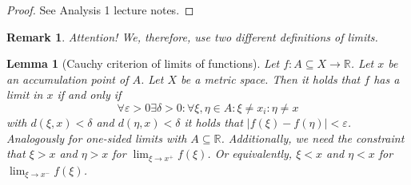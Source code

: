\documentclass{article}
\newtheorem{lemma}{Lemma}  \numberwithin{lemma}{section}
\newtheorem{remark}{Remark}  \numberwithin{remark}{section}
\newcommand{\card}[1]{\left|#1\right|}
\begin{document}
\begin{proof}
  See Analysis 1 lecture notes.
\end{proof}

\begin{remark}
  Attention! We, therefore, use two different definitions of limits.
\end{remark}

\begin{lemma}[Cauchy criterion of limits of functions] %
  \label{cauchy-crit}
  Let $f: A \subseteq X \to \mathbb R$. Let $x$ be an accumulation point of $A$.
  Let $X$ be a metric space. Then it holds that
  $f$ has a limit in $x$ if and only if
  \[ \forall \varepsilon > 0 \exists \delta > 0: \forall \xi, \eta \in A: \xi \neq x_i: \eta \neq x \]
  with $d(\xi, x) < \delta$ and $d(\eta, x) < \delta$ it holds that $\card{f(\xi) - f(\eta)} < \varepsilon$.
  Analogously for one-sided limits with $A \subseteq \mathbb R$.
  Additionally, we need the constraint that $\xi > x$ and $\eta > x$ for $\lim_{\xi \to x^+} f(\xi)$.
  Or equivalently, $\xi < x$ and $\eta < x$ for $\lim_{\xi \to x^-} f(\xi)$.
\end{lemma}
\end{document}
